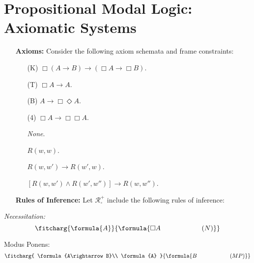 \documentclass[a4paper, 11pt]{article} %
\renewcommand{\L}[0]{\mathcal{L}}
\begin{document}
\section*{\sc Propositional Modal Logic: Axiomatic Systems}

\begin{enumerate}[leftmargin=1.2in,labelsep=.15in] %
\item[\bf Axioms:] Consider the following axiom schemata and frame constraints:\vspace{-.05in}
	\begin{multicols}{2}
	\begin{enumerate}
	\item[(K)] $\Box(A\rightarrow B)\rightarrow(\Box A\rightarrow\Box B)$.
	\item[(T)] $\Box A\rightarrow A$.
	\item[(B)] $A\rightarrow\Box\Diamond A$.
	\item[(4)] $\Box A\rightarrow\Box\Box A$.
	
	\item[] \textit{None}.
	\item[] $R(w,w)$.
	\item[] $R(w,w')\rightarrow R(w',w)$.
	\item[] $[R(w,w')\wedge R(w',w'')]{\rightarrow}R(w,w'')$.
	\end{enumerate}
	\end{multicols}
\item[\bf Rules of Inference:] Let $\mathcal{R}_\square^+$ include the following rules of inference:
\end{enumerate}
	
	
\begin{multicols}{2}\it
Necessitation:\vspace{-.05in}
\begin{equation*}
\fitcharg{
\formula{A}
}{
\formula{\Box A \hspace*{.83in}(N)}
}
\end{equation*}

Modus Ponens:\vspace{-.05in}
\begin{equation*}
\fitcharg{
\formula{A\rightarrow B}\\
\formula{A}
}{
\formula{B \hspace*{.8in}(MP)}
}
\end{equation*}
\end{multicols}
\vspace{-.2in}
\end{document}
